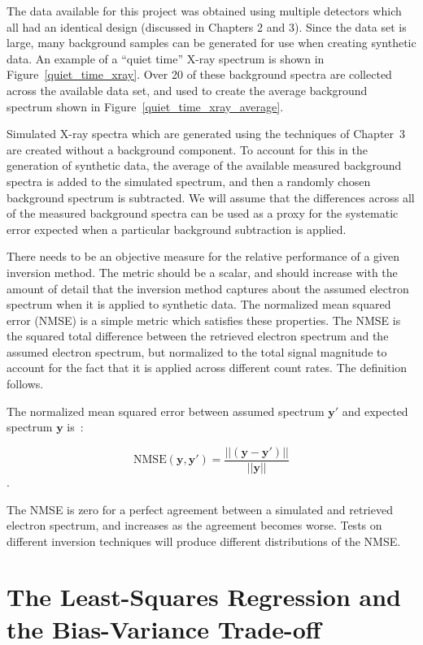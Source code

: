 The data available for this project was obtained using multiple detectors which all had an identical design (discussed in Chapters 2 and 3). Since the data set is large, many background samples can be generated for use when creating synthetic data. An example of a ``quiet time'' X-ray spectrum is shown in Figure~\ref{quiet_time_xray}. Over 20 of these background spectra are collected across the available data set, and used to create the average background spectrum shown in Figure~\ref{quiet_time_xray_average}.

Simulated X-ray spectra which are generated using the techniques of Chapter~3 are created without a background component. To account for this in the generation of synthetic data, the average of the available measured background spectra is added to the simulated spectrum, and then a randomly chosen background spectrum is subtracted. We will assume that the differences across all of the measured background spectra can be used as a proxy for the systematic error
expected when a particular background subtraction is applied. 

There needs to be an objective measure for the relative performance of a given inversion method. The metric should be a scalar, and should increase with the amount of detail that the inversion method captures about the assumed electron spectrum when it is applied to synthetic data. The normalized mean squared error (NMSE) is a simple metric which satisfies these properties. The NMSE is the squared total difference between the retrieved electron spectrum and the assumed electron spectrum, but normalized to the total signal magnitude to account for the fact that it is applied across different count rates. The definition follows.

\begin{definition}[NMSE]
The normalized mean squared error between assumed spectrum $\mathbf{y'}$ and expected spectrum $\mathbf{y}$ is~\citep{Hanha1988}: 

$$\mbox{NMSE}(\mathbf{y},\mathbf{y'}) = \frac{\vert \vert (\mathbf{y} - \mathbf{y'}) \vert \vert}{\vert \vert \mathbf{y} \vert \vert}$$.
\end{definition}

The NMSE is zero for a perfect agreement between a simulated and retrieved electron spectrum, and increases as the agreement becomes worse. Tests on different inversion techniques will produce different distributions of the NMSE.

\section{The Least-Squares Regression and the Bias-Variance Trade-off}


